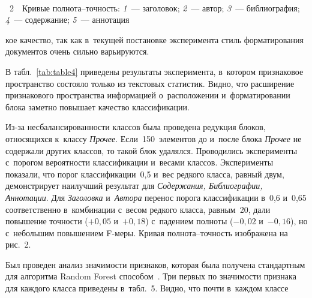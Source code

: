 \begin{multicols}{2}
{ \begin{center}  %
  \mbox{%
 \epsfxsize=78.254mm 
 }


\end{center}


\noindent
{{\figurename~2}\ \ \small{Кривые полнота--точ\-ность:
           \textit{1}~--- заголовок;
               \textit{2}~--- автор; 
           \textit{3}~--- биб\-лио\-гра\-фия; \textit{4}~--- содержание;
    \textit{5}~--- аннотация}}
}

\vspace*{9pt}

\setcounter{figure}{2} 



\noindent
кое качество, так как 
в~текущей по\-ста\-нов\-ке 
эксперимента стиль форматирования документов очень сильно 
варьируются.


В табл.~\ref{tab:table4} приведены результаты эксперимента, в~котором 
признаковое пространство со\-сто\-яло только из текстовых статистик. Вид\-но, что 
расширение признакового про\-стран\-ст\-ва информацией о~расположении и~форматировании 
блока заметно повышает качество классификации.

Из-за несбалансированности классов была проведена редукция блоков, относящихся 
к~классу \textit{Прочее}. Если~150~элементов до и~после блока \textit{Прочее} не 
содержали других классов, то такой блок удалялся. Проводились эксперименты 
с~порогом ве\-ро\-ят\-ности классификации и~весами классов. Эксперименты показали, что 
порог классификации~0,5 и~вес редкого класса, равный двум, демонстрирует 
наилучший результат для  \textit{Содержания, Библиографии, Аннотации}. Для 
\textit{Заголовка} и~\textit{Автора} перенос порога классификации в~0,6 и~0,65 
соответственно в~ком\-би\-на\-ции с~весом редкого класса, равным~20, дали 
повышение точ\-ности ($+0{,}05$ и~$+0{,}18$) с~падением пол\-но\-ты ($-0{,}02$ и~$-0{,}16$), 
но с~небольшим повышением F-ме\-ры. 
Кривая пол\-но\-та--точ\-ность изоб\-ра\-же\-на на 
рис.~2.

 







Был проведен анализ значимости признаков, которая была получена стандартным для 
алгоритма Random Forest способом~\cite{Breiman}. Три первых по значимости 
при\-зна\-ка для каж\-до\-го класса приведены в~табл.~5. 
Видно, что почти в~каждом классе\linebreak\vspace*{-12pt}


\end{multicols}
